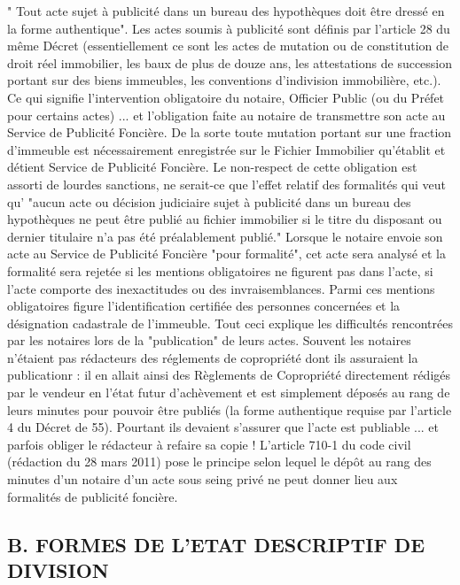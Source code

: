 		" Tout acte sujet à publicité dans un bureau des hypothèques doit être dressé en la forme authentique".
		Les actes soumis à publicité sont définis par l'article 28 du même Décret (essentiellement ce sont les actes de mutation ou de constitution de droit réel immobilier, les baux de plus de douze ans, les attestations de succession portant sur des biens immeubles, les conventions d'indivision immobilière, etc.).
		Ce qui signifie l'intervention obligatoire du notaire, Officier Public (ou du Préfet pour certains actes) ... et l'obligation faite au notaire de transmettre son acte au Service de Publicité Foncière.
		De la sorte toute mutation portant sur une fraction d'immeuble est nécessairement enregistrée sur le Fichier Immobilier qu'établit et détient Service de Publicité Foncière.
		Le non-respect de cette obligation est assorti de lourdes sanctions, ne serait-ce que l'effet relatif des formalités qui veut qu' "aucun acte ou décision judiciaire sujet à publicité dans un bureau des hypothèques ne peut être publié au fichier immobilier si le titre du disposant ou dernier titulaire n'a pas été préalablement publié."
		Lorsque le notaire envoie son acte au Service de Publicité Foncière "pour formalité", cet acte sera analysé et la formalité sera rejetée si les mentions obligatoires ne figurent pas dans l'acte, si l'acte comporte des inexactitudes ou des invraisemblances.
		Parmi ces mentions obligatoires figure l'identification certifiée des personnes concernées et la désignation cadastrale de l'immeuble.
		Tout ceci explique les difficultés rencontrées par les notaires lors de la "publication" de leurs actes. Souvent les notaires n’étaient pas rédacteurs des réglements de copropriété dont ils assuraient la publicationr : il en allait ainsi des Règlements de Copropriété directement rédigés par le vendeur en l'état futur d'achèvement et est simplement déposés au rang de leurs minutes pour pouvoir être publiés (la forme authentique requise par l'article 4 du Décret de 55). Pourtant ils devaient s'assurer que l'acte est publiable ... et parfois obliger le rédacteur à refaire sa copie !
		L’article 710-1 du code civil (rédaction du 28 mars 2011) pose le principe selon lequel le dépôt au rang des minutes d'un notaire d'un acte sous seing privé ne peut donner lieu aux formalités de publicité foncière.
	
	\subsection{B. FORMES DE L'ETAT DESCRIPTIF DE DIVISION}
	
